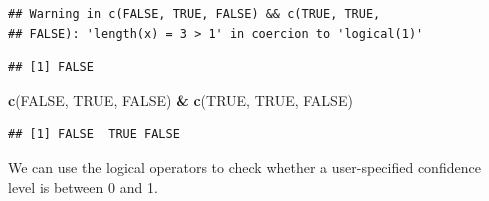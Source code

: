 \documentclass[
]{krantz}
\newenvironment{Shaded}{\begin{snugshade}}{\end{snugshade}}
\newcommand{\KeywordTok}[1]{\textcolor[rgb]{0.13,0.29,0.53}{\textbf{#1}}}
\newcommand{\NormalTok}[1]{#1}
\newcommand{\OperatorTok}[1]{\textcolor[rgb]{0.81,0.36,0.00}{\textbf{#1}}}
\newcommand{\OtherTok}[1]{\textcolor[rgb]{0.56,0.35,0.01}{#1}}
\newcommand{\StringTok}[1]{\textcolor[rgb]{0.31,0.60,0.02}{#1}}
\begin{document}
\begin{verbatim}
## Warning in c(FALSE, TRUE, FALSE) && c(TRUE, TRUE,
## FALSE): 'length(x) = 3 > 1' in coercion to 'logical(1)'
\end{verbatim}

\begin{verbatim}
## [1] FALSE
\end{verbatim}

\begin{Shaded}
\begin{Highlighting}[]
\KeywordTok{c}\NormalTok{(}\OtherTok{FALSE}\NormalTok{, }\OtherTok{TRUE}\NormalTok{, }\OtherTok{FALSE}\NormalTok{) }\OperatorTok{\&}\StringTok{ }\KeywordTok{c}\NormalTok{(}\OtherTok{TRUE}\NormalTok{, }\OtherTok{TRUE}\NormalTok{, }\OtherTok{FALSE}\NormalTok{)}
\end{Highlighting}
\end{Shaded}

\begin{verbatim}
## [1] FALSE  TRUE FALSE
\end{verbatim}

We can use the logical operators to check whether a user-specified confidence level is between 0 and 1.
\end{document}
